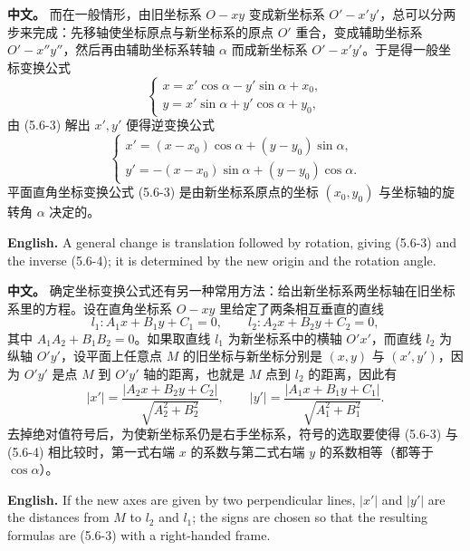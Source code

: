 \documentclass[UTF8,11pt,a4paper]{ctexart}
\newcommand{\APS}[2]{\par\noindent\textbf{中文。} #1\par\noindent\textbf{English.} #2\par\smallskip}
\theoremstyle{definition}
\begin{document}
\APS{而在一般情形，由旧坐标系 $O-xy$ 变成新坐标系 $O'-x'y'$，总可以分两步来完成：先移轴使坐标原点与新坐标系的原点 $O'$ 重合，变成辅助坐标系 $O'-x''y''$，然后再由辅助坐标系转轴 $\alpha$ 而成新坐标系 $O'-x'y'$。于是得一般坐标变换公式
\[
\begin{cases}x=x'\cos\alpha-y'\sin\alpha+x_0,\\ y=x'\sin\alpha+y'\cos\alpha+y_0,\end{cases}\tag{5.6-3}
\]
由 (5.6-3) 解出 $x',y'$ 便得逆变换公式
\[
\begin{cases}x'=(x-x_0)\cos\alpha+(y-y_0)\sin\alpha,\\ y'=-(x-x_0)\sin\alpha+(y-y_0)\cos\alpha.\end{cases}\tag{5.6-4}
\]
平面直角坐标变换公式 (5.6-3) 是由新坐标系原点的坐标 $(x_0,y_0)$ 与坐标轴的旋转角 $\alpha$ 决定的。}{A general change is translation followed by rotation, giving (5.6-3) and the inverse (5.6-4); it is determined by the new origin and the rotation angle.}

\APS{确定坐标变换公式还有另一种常用方法：给出新坐标系两坐标轴在旧坐标系里的方程。设在直角坐标系 $O-xy$ 里给定了两条相互垂直的直线
\[
l_1:A_1x+B_1y+C_1=0,\qquad l_2:A_2x+B_2y+C_2=0,
\]
其中 $A_1A_2+B_1B_2=0$。如果取直线 $l_1$ 为新坐标系中的横轴 $O'x'$，而直线 $l_2$ 为纵轴 $O'y'$，设平面上任意点 $M$ 的旧坐标与新坐标分别是 $(x,y)$ 与 $(x',y')$，因为 $O'y'$ 是点 $M$ 到 $O'y'$ 轴的距离，也就是 $M$ 点到 $l_2$ 的距离，因此有
\[
|x'|=\frac{|A_2x+B_2y+C_2|}{\sqrt{A_2^2+B_2^2}},\qquad |y'|=\frac{|A_1x+B_1y+C_1|}{\sqrt{A_1^2+B_1^2}}.
\]
去掉绝对值符号后，为使新坐标系仍是右手坐标系，符号的选取要使得 (5.6-3) 与 (5.6-4) 相比较时，第一式右端 $x$ 的系数与第二式右端 $y$ 的系数相等（都等于 $\cos\alpha$）。}{If the new axes are given by two perpendicular lines, $|x'|$ and $|y'|$ are the distances from $M$ to $l_2$ and $l_1$; the signs are chosen so that the resulting formulas are (5.6-3) with a right-handed frame.}
\end{document}
